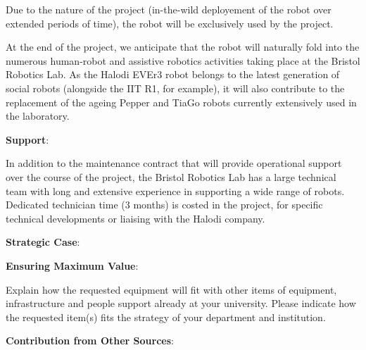 Due to the nature of the project (in-the-wild deployement of the robot over
extended periods of time), the robot will be exclusively used by the project.

At the end of the project, we anticipate that the robot will naturally
fold into the numerous human-robot and assistive robotics activities taking
place at the Bristol Robotics Lab. As the Halodi EVEr3 robot belongs to the
latest generation of social robots (alongside the IIT R1, for example), it will
also contribute to the replacement of the ageing Pepper and TiaGo robots
currently extensively used in the laboratory.


\textbf{Support}: 


In addition to the maintenance contract that will provide operational support
over the course of the project, the Bristol Robotics Lab has a large technical
team with long and extensive experience in supporting a wide range of robots.
Dedicated technician time (3 months) is costed in the project, for specific
technical developments or liaising with the Halodi company.

\textbf{Strategic Case}:



\textbf{Ensuring Maximum Value}:

Explain how the requested equipment will fit with other items of equipment,
infrastructure and people support already at your university. Please indicate
how the requested item(s) fits the strategy of your department and institution.

\textbf{Contribution from Other Sources}:




